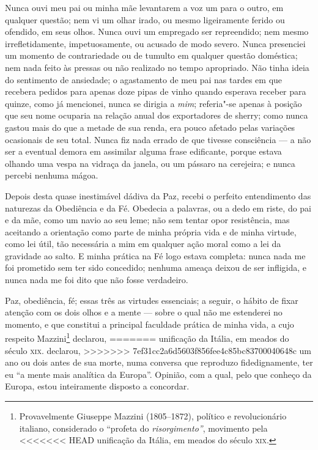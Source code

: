 {{{{{{{{{{{{{{{Nunca ouvi meu pai ou minha mãe levantarem a voz um para o outro, em
qualquer questão; nem vi um olhar irado, ou mesmo ligeiramente ferido ou
ofendido, em seus olhos. Nunca ouvi um empregado ser repreendido; nem
mesmo irrefletidamente, impetuosamente, ou acusado de modo severo. Nunca
presenciei um momento de contrariedade ou de tumulto em qualquer questão
doméstica; nem nada feito às pressas ou não realizado no tempo
apropriado. Não tinha ideia do sentimento de ansiedade; o agastamento de
meu pai nas tardes em que recebera pedidos para apenas doze pipas de
vinho quando esperava receber para quinze, como já mencionei, nunca se
dirigia a \textit{mim}; referia"-se apenas à posição que seu nome ocuparia
na relação anual dos exportadores de sherry; como nunca gastou mais do
que a metade de sua renda, era pouco afetado pelas variações ocasionais
de seu total. Nunca fiz nada errado de que tivesse consciência --- a não
ser a eventual demora em assimilar alguma frase edificante, porque
estava olhando uma vespa na vidraça da janela, ou um pássaro na
cerejeira; e nunca percebi nenhuma mágoa.

Depois desta quase inestimável dádiva da Paz, recebi o perfeito
entendimento das naturezas da Obediência e da Fé. Obedecia a palavras,
ou a dedo em riste, do pai e da mãe, como um navio ao seu leme; não sem
tentar opor resistência, mas aceitando a orientação como parte de minha
própria vida e de minha virtude, como lei útil, tão necessária a mim em
qualquer ação moral como a lei da gravidade ao salto. E minha prática na
Fé logo estava completa: nunca nada me foi prometido sem ter sido
concedido; nenhuma ameaça deixou de ser infligida, e nunca nada me foi
dito que não fosse verdadeiro.

Paz, obediência, fé; essas três as virtudes essenciais; a seguir, o
hábito de fixar atenção com os dois olhos e a mente --- sobre o qual não
me estenderei no momento, e que constitui a principal faculdade prática
de minha vida, a cujo respeito Mazzini\footnote{Provavelmente Giuseppe
  Mazzini (1805--1872), político e revolucionário italiano,
  considerado o ``profeta do \textit{risorgimento''}, movimento pela
<<<<<<< HEAD
  unificação da Itália, em meados do século \textsc{xix}.} declarou,
=======
  unificação da Itália, em meados do século \textsc{xix}.  declarou,
>>>>>>> 7ef31cc2a6d5603f856fee4c85bc83700040648c
um ano ou dois antes de sua morte, numa conversa que reproduzo
fidedignamente, ter eu ``a mente mais analítica da Europa''. Opinião,
com a qual, pelo que conheço da Europa, estou inteiramente disposto a
concordar.

}}}}}}}}}}}}}}}

